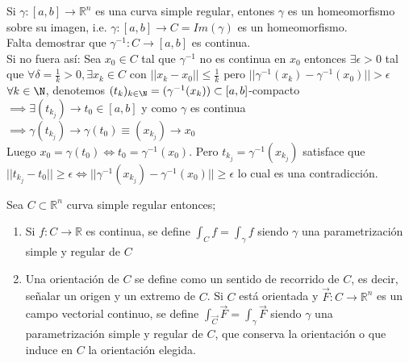 
\begin{observación}
Si $\gamma: [a,b] \to \mathbb{R}^n$ es una curva simple regular, entones $\gamma$ es un homeomorfismo sobre su imagen, i.e. $\gamma: [a, b] \to C = Im(\gamma)$ es un homeomorfismo. \\
Falta demostrar que $\gamma^{-1}: C \to [a,b]$ es continua.\\
Si no fuera así: Sea $x_0 \in C$ tal que $\gamma^{-1}$ no es continua en $x_0$ entonces $\exists \epsilon > 0$ tal que $\forall \delta = \frac{1}{k} > 0, \exists x_k \in C$ con $ ||x_k - x_0|| \leq \frac{1}{k}$ pero $||\gamma^{-1}(x_k) - \gamma^{-1}(x_0)|| > \epsilon$ \\
$\forall k \in \N$, denotemos $(t_k)_{k \in \N} = (\gamma^{-1}(x_k)) \subset [a,b]$-compacto $\implies \exists (t_{k_j}) \to t_0 \in [a,b]$ y como $\gamma$ es continua $\implies \gamma(t_{k_j}) \to \gamma(t_0) \equiv (x_{k_j}) \to x_0$ \\
Luego $x_0 = \gamma(t_0) \iff t_0 = \gamma^{-1}(x_0)$. Pero $t_{k_j} = \gamma^{-1}(x_{k_j})$ satisface que $||t_{k_j} - t_0|| \geq \epsilon \iff ||\gamma^{-1}(x_{k_j}) - \gamma^{-1}(x_0)|| \geq \epsilon$ lo cual es una contradicción.
\end{observación}

\begin{definición} 
Sea $C \subset \mathbb{R}^n$ curva simple regular entonces;
\begin{enumerate}
    \item Si $f: C \to \mathbb{R}$ es continua, se define $\int_{C} f = \int_{\gamma} f$
          siendo $\gamma$ una parametrización simple y regular de $C$
    \item Una orientación de $C$ se define como un sentido de recorrido de $C$, es decir,
          señalar un origen y un extremo de $C$. Si $C$ está orientada y $\vec{F}: C \to
              \mathbb{R}^n$ es un campo vectorial continuo, se define $\int_{\vec{C}} \vec{F}
              = \int_{\gamma} \vec{F}$ siendo $\gamma$ una parametrización simple y regular
          de $C$, que conserva la orientación o que induce en $C$ la orientación elegida. \end{enumerate}
\end{definición}

